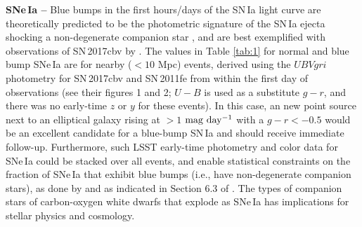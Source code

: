 \documentclass[11pt]{article}
\begin{document}
{\bf SNe\,Ia --} Blue bumps in the first hours/days of the SN\,Ia light curve are theoretically predicted to be the photometric signature of the SN\,Ia ejecta shocking a non-degenerate companion star \citep{2010ApJ...708.1025K}, and are best exemplified with observations of SN\,2017cbv by \cite{2017ApJ...845L..11H}. The values in Table \ref{tab:1} for normal and blue bump SNe\,Ia are for nearby ($<10$ Mpc) events, derived using the $UBVgri$ photometry for SN\,2017cbv and SN\,2011fe from \cite{2010ApJ...708.1025K} within the first day of observations (see their figures 1 and 2; $U-B$ is used as a substitute $g-r$, and there was no early-time $z$ or $y$ for these events). In this case, an new point source next to an elliptical galaxy rising at $>1$ $\rm mag\ day^{-1}$ with a $g-r < -0.5$ would be an excellent candidate for a blue-bump SN\,Ia and should receive immediate follow-up. %
Furthermore, such LSST early-time photometry and color data for SNe\,Ia could be stacked over all events, and enable statistical constraints on the fraction of SNe\,Ia that exhibit blue bumps (i.e., have non-degenerate companion stars), as done by \citealt{Bianco2011} and as indicated in Section 6.3 of \citealt{COSEP}. The types of companion stars of carbon-oxygen white dwarfs that explode as SNe\,Ia has implications for stellar physics and cosmology.




\clearpage
\end{document}
